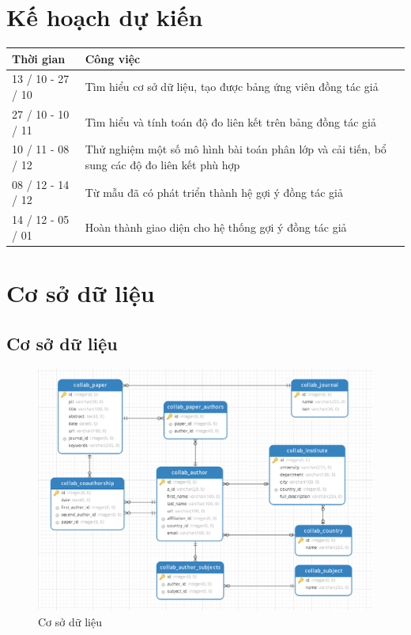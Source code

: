 \documentclass{article}
\begin{document}
\section{Kế hoạch dự kiến}

\begin{tabular}{|l|l|}
\hline 
Thời gian & Công việc \\ 
\hline 
13 / 10 - 27 / 10 & Tìm hiểu cơ sở dữ liệu, tạo được bảng ứng viên đồng tác giả \\ 
\hline 
27 / 10 - 10 / 11 & Tìm hiểu và tính toán độ đo liên kết trên bảng đồng tác giả \\ 
\hline 
10 / 11 - 08 / 12 & Thử nghiệm một số mô hình bài toán phân lớp và cải tiến, bổ sung các độ đo liên kết phù hợp \\ 
\hline 
08 / 12 - 14 / 12 & Từ mẫu đã có phát triển thành hệ gợi ý đồng tác giả \\ 
\hline 
14 / 12 - 05 / 01 & Hoàn thành giao diện cho hệ thống gợi ý đồng tác giả \\ 
\hline 
\end{tabular} 

\newpage

\section{Cơ sở dữ liệu}

\subsection{Cơ sở dữ liệu}

\begin{figure}[h]
\includegraphics[width=\textwidth]{image/database.png} 
\caption{Cơ sở dữ liệu}
\end{figure}
\end{document}
